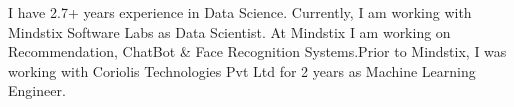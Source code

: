 
\begin{cvparagraph}
I have 2.7+ years experience in Data Science. Currently, I am working with Mindstix Software Labs as Data Scientist. At Mindstix I am working on Recommendation, ChatBot \& Face Recognition Systems.\newline Prior to Mindstix, I was working with Coriolis Technologies Pvt Ltd for 2 years as Machine Learning Engineer.
\end{cvparagraph}
